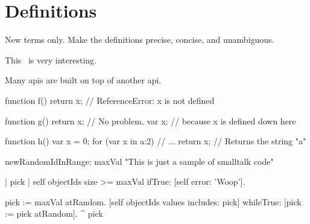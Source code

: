 \chapter{Definitions}
\thispagestyle{fancy}
\label{c:definitions}

New terms only. Make the definitions precise, concise, and unambiguous.

This~\cite{Lincke2012} is very interesting.

Many \acp{api} are built on top of another \ac{api}.

\begin{javascript}[float=htbp,caption=Scoping in JavaScript,label=l:jsscoping]
function f() {
  return x;   // ReferenceError: x is not defined
}

function g() {
  return x;   // No problem,
  var x;      // because x is defined down here
}

function h() {
  var x = 0;
  for (var x in {a:2}) {
    // ...
  }
  return x;   // Returns the string "a"
}
\end{javascript}

\begin{smalltalk}[float=htbp,caption=Smalltalk Sample]
newRandomIdInRange: maxVal
	"This is just a sample of smalltalk code"
	
	| pick |
	self objectIds size >= maxVal ifTrue: [self error: 'Woop'].
	
	pick := maxVal atRandom.
	[self objectIds values includes: pick] 
		whileTrue: [pick := pick atRandom].
	^  pick
\end{smalltalk}

%

%
%
